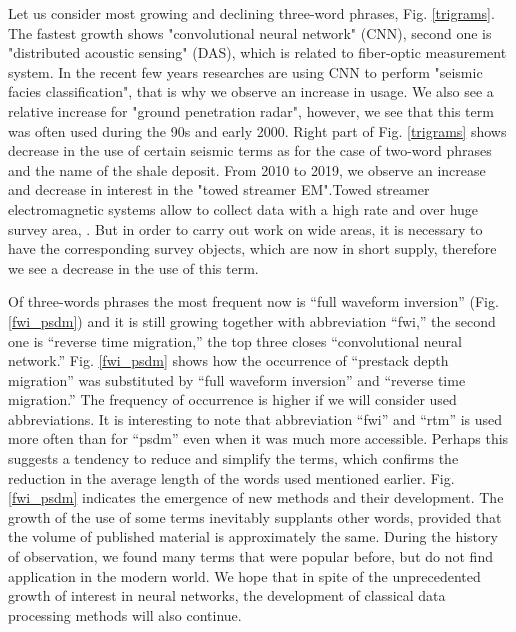\documentclass[geosciences,article,submit,moreauthors,pdftex]{Definitions/mdpi}
\begin{document}
Let us consider most growing and declining three-word phrases, Fig. \ref{trigrams}. The fastest growth shows "convolutional neural network" (CNN), second one is "distributed acoustic sensing" (DAS), which is related to fiber-optic measurement system. In the recent few years researches are using CNN to perform "seismic facies classification", that is why we observe an increase in usage. We also see a relative increase for "ground penetration radar", however, we see that this term was often used during the 90s and early 2000. Right part of Fig. \ref{trigrams} shows decrease in the use of certain seismic terms as for the case of two-word phrases and the name of the shale deposit. From 2010 to 2019, we observe an increase and decrease in interest in the "towed streamer EM".Towed streamer electromagnetic systems allow to collect data with a high rate and over huge survey area, \citep{Zhdanov2015}. But in order to carry out work on wide areas, it is necessary to have the corresponding survey objects, which are now in short supply, therefore we see a decrease in the use of this term.


Of three-words phrases the most frequent now is “full waveform inversion” (Fig. \ref{fwi_psdm}) and it is still growing together with abbreviation “fwi,” the second one is “reverse time migration,” the top three closes “convolutional neural network.” Fig. \ref{fwi_psdm} shows how the occurrence of “prestack depth migration” was substituted by “full waveform inversion” and “reverse time migration.” The frequency of occurrence is higher if we will consider used abbreviations. It is interesting to note that abbreviation “fwi” and “rtm” is used more often than for “psdm” even when it was much more accessible. Perhaps this suggests a tendency to reduce and simplify the terms, which confirms the reduction in the average length of the words used mentioned earlier. Fig. \ref{fwi_psdm} indicates the emergence of new methods and their development.  The growth of the use of some terms inevitably supplants other words, provided that the volume of published material is approximately the same. During the history of observation, we found many terms that were popular before, but do not find application in the modern world. We hope that in spite of the unprecedented growth of interest in neural networks, the development of classical data processing methods will also continue.
\end{document}
